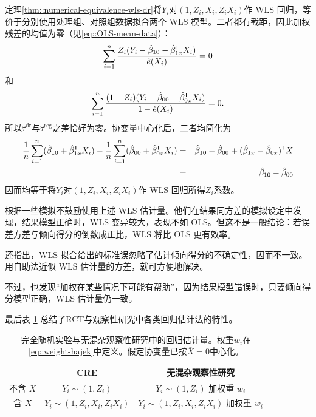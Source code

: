 \begin{myproof}{定理}{\ref{thm::numerical-equivalence-wls-dr}}将$Y_i$对$(1,Z_i, X_i, Z_iX_i)$作 WLS 回归，等价于分别使用处理组、对照组数据拟合两个 WLS 模型。二者都有截距，因此加权残差的均值为零（见\eqref{eq::OLS-mean-data}）：
$$
\sum_{i=1}^n  \frac{Z_i ( Y_i- \hat \beta_{10} -  \hat \beta_{1x}^{\mkern-1.5mu\mathsf{T}} X_i ) }{  \hat{e}(X_i) }   =0 
$$
和
$$
\sum_{i=1}^n  \frac{(1-Z_i) (  Y_i-\hat \beta_{00}  -   \hat\beta_{0x}^{\mkern-1.5mu\mathsf{T}} X_i   ) }{  1-\hat{e}(X_i) }  = 0 .
$$
所以$\hat{\tau}^\text{dr} $与$\hat{\tau}^\text{reg}$之差恰好为零。协变量中心化后，二者均简化为
\begin{eqnarray*}
 \frac{1}{n} \sum_{i=1}^n (\hat \beta_{10} +   \hat \beta_{1x}^{\mkern-1.5mu\mathsf{T}} X_i)   - \frac{1}{n} \sum_{i=1}^n (\hat \beta_{00} +   \hat\beta_{0x}^{\mkern-1.5mu\mathsf{T}} X_i)  
&=& \hat \beta_{10} - \hat \beta_{00}  + (\hat \beta_{1x} - \hat\beta_{0x})^{\mkern-1.5mu\mathsf{T}} \bar{X} \\
&=&\hat \beta_{10} - \hat \beta_{00}
\end{eqnarray*}
因而均等于将$Y_i$对$(1,Z_i, X_i, Z_iX_i)$作 WLS 回归所得$Z_i$系数。 
\end{myproof} 


\citet{freedman2008weighting}根据一些模拟不鼓励使用上述 WLS 估计量。他们在结果同方差的模拟设定中发现，结果模型正确时，WLS 变异较大，表现不如 OLS。但这不是一般结论：若误差方差与倾向得分的倒数成正比，WLS 将比 OLS 更有效率。 

\citet{freedman2008weighting}还指出，WLS 拟合给出的标准误忽略了估计倾向得分的不确定性，因而不一致。用自助法近似 WLS 估计量的方差，就可方便地解决。 


不过，\citet{freedman2008weighting}也发现“加权在某些情况下可能有帮助”，因为结果模型错误时，只要倾向得分模型正确，WLS 估计量仍一致。 



最后表 \ref{table::regression-causal-cre-obs} 总结了RCT与观察性研究中各类回归估计法的特性。 



\begin{table}
\caption{完全随机实验与无混杂观察性研究中的回归估计量。权重$w_i$在\eqref{eq::weight-hajek}中定义。假定协变量已按$\bar{X} = 0$中心化。}\label{table::regression-causal-cre-obs}
\begin{tabular}{|c|cc|}
\hline 
 & CRE & 无混杂观察性研究 \\
 \hline 
不含 $X$ &  $Y_i\sim (1, Z_i)$ & $Y_i\sim (1, Z_i)$ 加权重 $w_i$   \\
含 $X$ & $Y_i\sim (1, Z_i ,X_i, Z_i X_i ) $ & $Y_i\sim (1, Z_i ,X_i, Z_i X_i )$ 加权重 $w_i$  \\
\hline 
\end{tabular}
\end{table}



